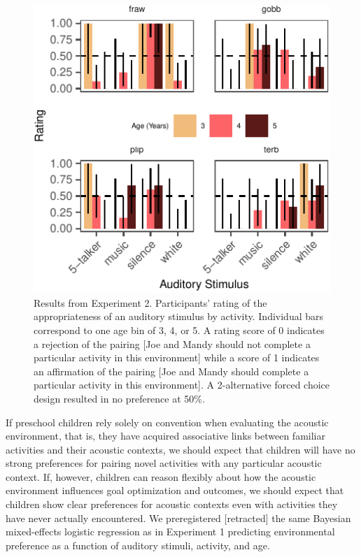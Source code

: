 \documentclass[10pt, letterpaper]{article}
\newenvironment{CodeChunk}{}{}
\begin{document}
\begin{CodeChunk}
\begin{figure}[t]

{\centering \includegraphics{figs/e4b-bar-1} 

}

\caption[Results from Experiment 2]{Results from Experiment 2. Participants' rating of the appropriateness of an auditory stimulus by activity. Individual bars correspond to one age bin of 3, 4, or 5. A rating score of 0 indicates a rejection of the pairing [Joe and Mandy should not complete a particular activity in this environment] while a score of 1 indicates an affirmation of the pairing [Joe and Mandy should complete a particular activity in this environment]. A 2-alternative forced choice design resulted in no preference at 50\%.}\label{fig:e4b-bar}
\end{figure}
\end{CodeChunk}

If preschool children rely solely on convention when evaluating the
acoustic environment, that is, they have acquired associative links
between familiar activities and their acoustic contexts, we should
expect that children will have no strong preferences for pairing novel
activities with any particular acoustic context. If, however, children
can reason flexibly about how the acoustic environment influences goal
optimization and outcomes, we should expect that children show clear
preferences for acoustic contexts even with activities they have never
actually encountered. We preregistered {[}retracted{]} the same Bayesian
mixed-effects logistic regression as in Experiment 1 predicting
environmental preference as a function of auditory stimuli, activity,
and age.
\end{document}
